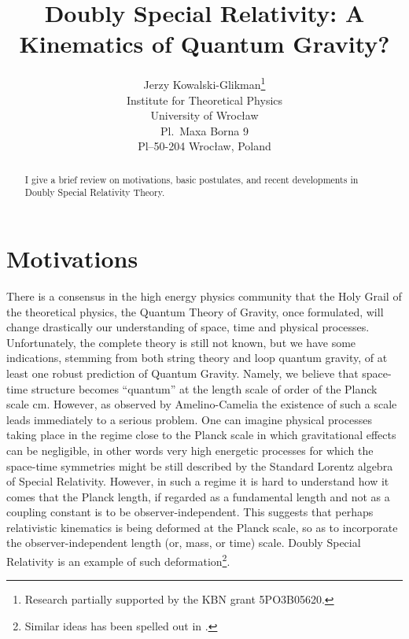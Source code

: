 \documentclass[a4paper,a4paper]{article}
\begin{document}
\title{Doubly Special Relativity: A Kinematics of Quantum Gravity?}

\author{Jerzy Kowalski-Glikman\footnote{Research  partially supported
by the    KBN grant 5PO3B05620.}\\Institute for Theoretical
Physics\\ University of Wroc\l{}aw\\ Pl.\ Maxa Borna 9\\
Pl--50-204 Wroc\l{}aw, Poland}

\maketitle

\begin{abstract}
  I give a brief review on motivations, basic postulates, and recent developments in Doubly Special Relativity Theory.
\end{abstract}



\section{Motivations}

There is a consensus in the high energy physics community that the Holy Grail of the theoretical physics, the Quantum Theory of Gravity, once formulated, will change drastically our understanding of space, time and physical processes. Unfortunately, the complete theory is still not known, but we have some indications, stemming from both string theory and loop quantum gravity, of at least one robust prediction of Quantum Gravity. Namely, we believe that space-time structure becomes ``quantum'' at the length scale of order of the Planck scale \coordHE{} cm. However, as observed by Amelino-Camelia \cite{gac} the existence of such a scale leads immediately to a serious problem. One can imagine physical processes taking place in the regime close to the Planck scale in which gravitational effects can be negligible, in other words very high energetic processes for which the space-time symmetries might be still described by the Standard Lorentz algebra of Special Relativity. However, in such a regime it is hard to understand how it comes that the Planck length, if regarded as a fundamental length and not as a coupling constant is to be observer-independent. This suggests that perhaps relativistic kinematics is being deformed at the Planck scale, so as to incorporate the observer-independent length (or, mass, or time) scale. Doubly Special Relativity is an example of such deformation\footnote{Similar ideas has been spelled out in \cite{ahluwalia}.}.
\end{document}
